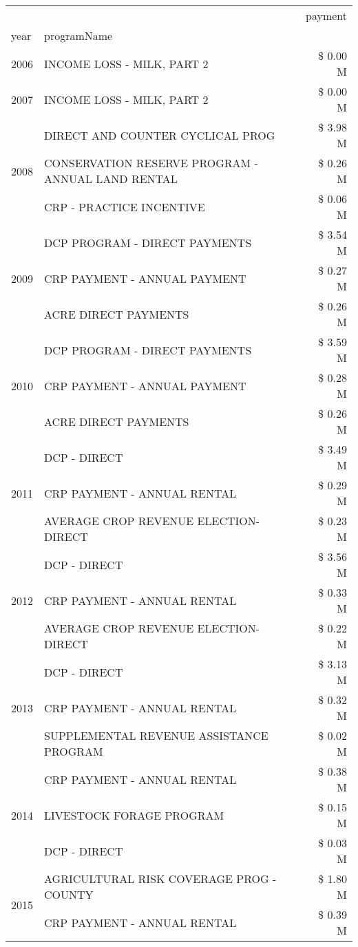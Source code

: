 \begin{tabular}{llr}
\toprule
 &  & payment \\
year & programName &  \\
\midrule
2006 & INCOME LOSS - MILK, PART 2 & \$ 0.00 M \\
\cline{1-3}
2007 & INCOME LOSS - MILK, PART 2 & \$ 0.00 M \\
\cline{1-3}
\multirow[t]{3}{*}{2008} & DIRECT AND COUNTER CYCLICAL PROG & \$ 3.98 M \\
 & CONSERVATION RESERVE PROGRAM - ANNUAL LAND RENTAL & \$ 0.26 M \\
 & CRP - PRACTICE INCENTIVE & \$ 0.06 M \\
\cline{1-3}
\multirow[t]{3}{*}{2009} & DCP PROGRAM - DIRECT PAYMENTS & \$ 3.54 M \\
 & CRP PAYMENT - ANNUAL PAYMENT & \$ 0.27 M \\
 & ACRE DIRECT PAYMENTS & \$ 0.26 M \\
\cline{1-3}
\multirow[t]{3}{*}{2010} & DCP PROGRAM - DIRECT PAYMENTS & \$ 3.59 M \\
 & CRP PAYMENT - ANNUAL PAYMENT & \$ 0.28 M \\
 & ACRE DIRECT PAYMENTS & \$ 0.26 M \\
\cline{1-3}
\multirow[t]{3}{*}{2011} & DCP - DIRECT & \$ 3.49 M \\
 & CRP PAYMENT - ANNUAL RENTAL & \$ 0.29 M \\
 & AVERAGE CROP REVENUE ELECTION-DIRECT & \$ 0.23 M \\
\cline{1-3}
\multirow[t]{3}{*}{2012} & DCP - DIRECT & \$ 3.56 M \\
 & CRP PAYMENT - ANNUAL RENTAL & \$ 0.33 M \\
 & AVERAGE CROP REVENUE ELECTION-DIRECT & \$ 0.22 M \\
\cline{1-3}
\multirow[t]{3}{*}{2013} & DCP - DIRECT & \$ 3.13 M \\
 & CRP PAYMENT - ANNUAL RENTAL & \$ 0.32 M \\
 & SUPPLEMENTAL REVENUE ASSISTANCE PROGRAM & \$ 0.02 M \\
\cline{1-3}
\multirow[t]{3}{*}{2014} & CRP PAYMENT - ANNUAL RENTAL & \$ 0.38 M \\
 & LIVESTOCK FORAGE PROGRAM & \$ 0.15 M \\
 & DCP - DIRECT & \$ 0.03 M \\
\cline{1-3}
\multirow[t]{3}{*}{2015} & AGRICULTURAL RISK COVERAGE PROG - COUNTY & \$ 1.80 M \\
 & CRP PAYMENT - ANNUAL RENTAL & \$ 0.39 M \\

\end{tabular}
